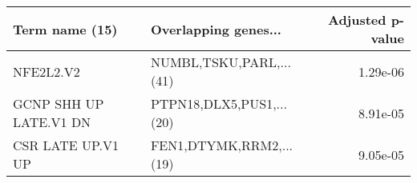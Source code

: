 \begin{tabular}{llr}
\toprule
        Term name (15) &     Overlapping genes... &  Adjusted p-value \\
\midrule
             NFE2L2.V2 &  NUMBL,TSKU,PARL,...(41) &          1.29e-06 \\
GCNP SHH UP LATE.V1 DN & PTPN18,DLX5,PUS1,...(20) &          8.91e-05 \\
     CSR LATE UP.V1 UP &  FEN1,DTYMK,RRM2,...(19) &          9.05e-05 \\
\bottomrule
\end{tabular}
